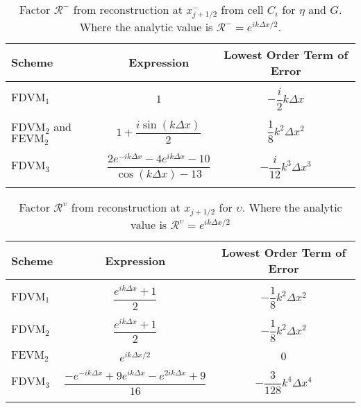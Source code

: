 \begin{table}
	\centering
	\begin{tabular}{l  c  c}
	 	Scheme& Expression& Lowest Order Term of Error\\
	 	\hline && \\
	 	$\text{FDVM}_1$& $1$ & $-\dfrac{i}{2}k \Delta x$ \\ & & \\
	 	$\text{FDVM}_2$ and $\text{FEVM}_2$& $1 +  \dfrac{i \sin\left(k\Delta x \right)}{2}$ & $\dfrac{1}{8}k^2 \Delta x^2$ \\ & & \\
	 	$\text{FDVM}_3$& $\dfrac{2 e^{-i k \Delta x} - 4e^{i k \Delta x} - 10}{\cos\left(k \Delta x\right) - 13}$ & $-\dfrac{i}{12}k^3 \Delta x^3$ \\ & & \\
	\end{tabular}
	\caption{Factor $\mathcal{R}^-$ from reconstruction at $x^-_{j+1/2}$ from cell $C_{i}$ for $\eta$ and $G$. Where the analytic value is $\mathcal{R}^- =e^{i k \Delta x/2}$.}
	\label{tab:Rmfactor}
\end{table}

\begin{table}
	\centering
	\begin{tabular}{l  c  c}
	   	Scheme& Expression& Lowest Order Term of Error\\
	   	\hline && \\
	   	$\text{FDVM}_1$& $\dfrac{e^{i k \Delta x} + 1}{2}$ & $-\dfrac{1}{8} k^2 \Delta x^2$ \\ & & \\
	   	$\text{FDVM}_2$& $\dfrac{e^{i k \Delta x} + 1}{2}$ & $-\dfrac{1}{8}k^2 \Delta x^2$ \\ & & \\
	   	$\text{FEVM}_2$ & $e^{i k \Delta x/2}$ & $0$ \\& & \\
	   	$\text{FDVM}_3$& $\dfrac{-e^{-ik \Delta x} + 9 e^{ik \Delta x} -e^{2ik \Delta x} + 9}{16}$ & $-\dfrac{3}{128}k^4 \Delta x^4$ \\ & & \\
	\end{tabular}
	\caption{Factor $\mathcal{R}^\upsilon$ from reconstruction at $x_{j+1/2}$ for $\upsilon$. Where the analytic value is $\mathcal{R}^\upsilon =e^{i k \Delta x/2}$}
    \label{tab:Rufactor}
\end{table}

